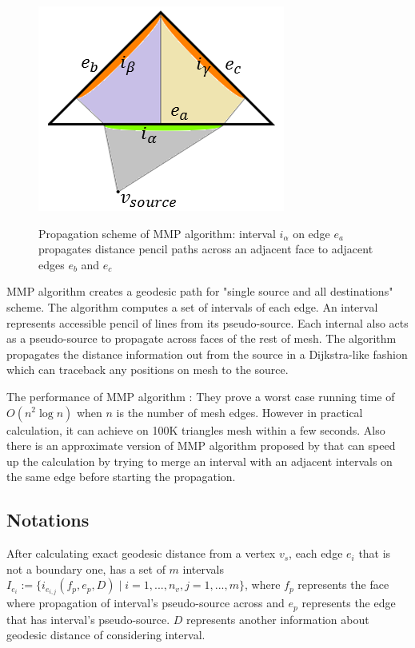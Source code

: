 \documentclass[a4paper,twoside]{article}
\begin{document}
\begin{figure}[!h]
	\centering
	{\includegraphics[width=0.75\columnwidth]{images/mmp_algorithm.png}}
	\caption{Propagation scheme of MMP algorithm: interval $i_{\alpha}$ on edge $e_a$ propagates distance pencil paths across an adjacent face to adjacent edges $e_b$ and $e_c$ }
	\label{fig:mmp algorithm}
\end{figure}

MMP algorithm creates a geodesic path for "single source and all destinations" scheme. The algorithm computes a set of intervals of each edge. An interval represents accessible pencil of lines from its pseudo-source. Each internal also acts as a pseudo-source to propagate across faces of the rest of mesh. The algorithm propagates the distance information out from the source in a Dijkstra-like fashion which can traceback any positions on mesh to the source.

The performance of MMP algorithm : They prove a worst case
running time of $O(n^2 \log n)$ when $n$ is the number of mesh edges. However in practical calculation, it can achieve on 100K triangles mesh within a few seconds. Also there is an approximate version of MMP algorithm proposed by \cite{Surazhsky:2005:FEA:1073204.1073228} that can speed up the calculation by trying to merge an interval with an adjacent intervals on the same edge before starting the propagation.

\subsection*{Notations}
After calculating exact geodesic distance from a vertex $v_s$, each edge $e_i$ that is not a boundary one, has a set of $m$ intervals $I_{e_i}:=\{ i_{e_{i,j}}(f_p,e_p,D) \mid i = 1, ... ,n_v , j = 1,...,m\}$, where $f_p$ represents the face where propagation of interval's pseudo-source across and $e_p$ represents the edge that has interval's pseudo-source. $D$ represents another information about geodesic distance of considering interval.
\end{document}
